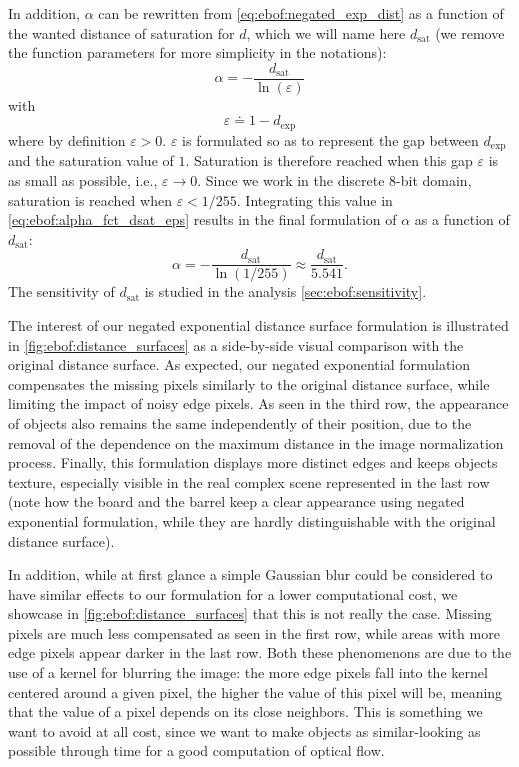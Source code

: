 In addition, \(\alpha\) can be rewritten from \cref{eq:ebof:negated_exp_dist} as a function of the wanted distance of saturation for \(d\), which we will name here \(d_\text{sat}\) (we remove the function parameters for more simplicity in the notations):
\begin{equation}\label{eq:ebof:alpha_fct_dsat_eps}
  \alpha = -\frac{d_\text{sat}}{\ln(\varepsilon)}
\end{equation}
with
\begin{equation}
  \varepsilon \doteq 1-d_\text{exp}
\end{equation}
where by definition \(\varepsilon > 0\). \(\varepsilon \) is formulated so as to represent the gap between \(d_\text{exp}\) and the saturation value of \(1\). Saturation is therefore reached when this gap \(\varepsilon \) is as small as possible, i.e., \(\varepsilon \to 0\). Since we work in the discrete 8-bit domain, saturation is reached when \(\varepsilon < 1/255\). Integrating this value in \cref{eq:ebof:alpha_fct_dsat_eps} results in the final formulation of \(\alpha \) as a function of \(d_\text{sat}\):
\begin{equation}
  \alpha = -\frac{d_\text{sat}}{\ln(1/255)} \approx \frac{d_\text{sat}}{5.541}.
\end{equation}
The sensitivity of \(d_\text{sat}\) is studied in the analysis \cref{sec:ebof:sensitivity}.

The interest of our negated exponential distance surface formulation is illustrated in \cref{fig:ebof:distance_surfaces} as a side-by-side visual comparison with the original distance surface. As expected, our negated exponential formulation compensates the missing pixels similarly to the original distance surface, while limiting the impact of noisy edge pixels. As seen in the third row, the appearance of objects also remains the same independently of their position, due to the removal of the dependence on the maximum distance in the image normalization process. Finally, this formulation displays more distinct edges and keeps objects texture, especially visible in the real complex scene represented in the last row (note how the board and the barrel keep a clear appearance using negated exponential formulation, while they are hardly distinguishable with the original distance surface).

In addition, while at first glance a simple Gaussian blur could be considered to have similar effects to our formulation for a lower computational cost, we showcase in \cref{fig:ebof:distance_surfaces} that this is not really the case. Missing pixels are much less compensated as seen in the first row, while areas with more edge pixels appear darker in the last row. Both these phenomenons are due to the use of a kernel for blurring the image: the more edge pixels fall into the kernel centered around a given pixel, the higher the value of this pixel will be, meaning that the value of a pixel depends on its close neighbors. This is something we want to avoid at all cost, since we want to make objects as similar-looking as possible through time for a good computation of optical flow.

